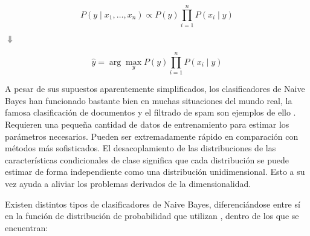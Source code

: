 \begin{equation}
	P(y \mid x_1, \dots, x_n) \propto P(y) \prod_{i=1}^{n} P(x_i \mid y)
\end{equation}

\begin{center}
	$\Downarrow$ 
\end{center}
\begin{equation}
	\hat{y} = \arg\max_y P(y) \prod_{i=1}^{n} P(x_i \mid y)
\end{equation}

A pesar de sus supuestos aparentemente simplificados, los clasificadores de Naive Bayes han funcionado bastante bien en muchas situaciones del mundo real, la famosa clasificación de documentos y el filtrado de spam son ejemplos de ello \cite{10.1007/BFb0026666, Chen2009, metsis2006spam}. Requieren una pequeña cantidad de datos de entrenamiento para estimar los parámetros necesarios. Pueden ser extremadamente rápido en comparación con métodos más sofisticados. El desacoplamiento de las distribuciones de las características condicionales de clase significa que cada distribución se puede estimar de forma independiente como una distribución unidimensional. Esto a su vez ayuda a aliviar los problemas derivados de la dimensionalidad. 

Existen distintos tipos de clasificadores de Naive Bayes, diferenciándose entre sí en la función de distribución de probabilidad que utilizan \cite{metsis2006spam,john1995estimating,manning2010introduction}, dentro de los que se encuentran:

